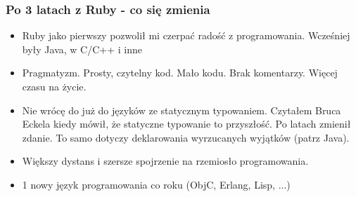 \documentclass[12t]{beamer}
\begin{document}
\begin{frame}
  \frametitle{Po 3 latach z Ruby - co się zmienia}
  \begin{itemize}
  \item Ruby jako pierwszy pozwolił mi czerpać radość z
    programowania. Wcześniej były Java, w C/C++ i inne
  \item Pragmatyzm. Prosty, czytelny kod. Mało kodu. Brak
    komentarzy. Więcej czasu na życie.
  \item Nie wrócę do już do języków ze statycznym typowaniem. Czytałem
    Bruca Eckela kiedy mówił, że statyczne typowanie to przyszłość. Po
    latach zmienił zdanie. To samo dotyczy deklarowania wyrzucanych
    wyjątków (patrz Java).
  \item Większy dystans i szersze spojrzenie na rzemiosło programowania.
  \item 1 nowy język programowania co roku (ObjC, Erlang, Lisp, ...)
  \end{itemize}
\end{frame}
\end{document}

